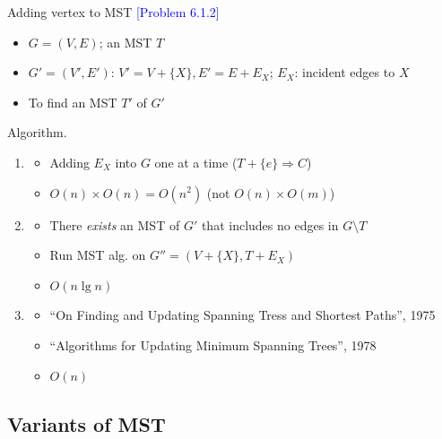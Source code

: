\documentclass{beamer}
\newcommand{\set}[1]{\{ #1 \}}
\newcommand{\problemno}[1]{\textcolor{blue}{\scriptsize [Problem #1]}}
\begin{document}
\begin{frame}{}
  \begin{block}{Adding vertex to MST \problemno{6.1.2}}
    \begin{itemize}
      \item $G = (V,E)$; an MST $T$
      \item $G' = (V',E')$: $V' = V + \set{X}, E' = E + E_X$; $E_X$: incident
      edges to $X$
      \item To find an MST $T'$ of $G'$
    \end{itemize}
  \end{block}

  \begin{block}{Algorithm.}
    \begin{enumerate}
      \item
        \begin{itemize}
      	  \item Adding $E_X$ into $G$ one at a time ($T + \set{e} \Rightarrow C$)
          \item $O(n) \times O(n) = O(n^2)$ (not $O(n) \times O(m)$)
        \end{itemize}
      \item
        \begin{itemize}
          \item There \emph{exists} an MST of $G'$ that includes no edges in $G
          \setminus T$
          \item Run MST alg. on $G'' =(V + \set{X}, T + E_X)$
          \item $O(n \lg n)$
        \end{itemize}
      \item
        \begin{itemize}
          \item ``On Finding and Updating Spanning Tress and Shortest Paths'',
          1975
          \item ``Algorithms for Updating Minimum Spanning Trees'', 1978
          \item $O(n)$
        \end{itemize}
    \end{enumerate}
  \end{block}
\end{frame}
\subsection{Variants of MST}
\end{document}
